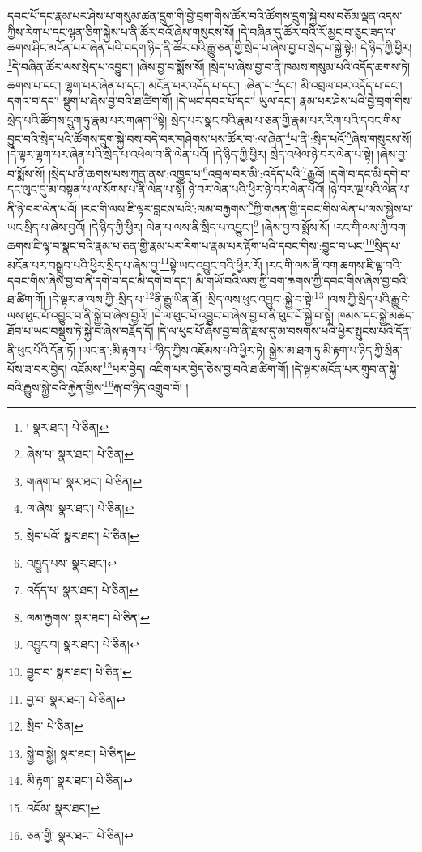 དབང་པོ་དང་རྣམ་པར་ཤེས་པ་གསུམ་ཚན་དྲུག་གི་བྱེ་བྲག་གིས་ཚོར་བའི་ཚོགས་དྲུག་སྐྱེ་བས་བཅོམ་ལྡན་འདས་ཀྱིས་རེག་པ་དང་ལྷན་ཅིག་སྐྱེས་པ་ནི་ཚོར་བའོ་ཞེས་གསུངས་སོ། །དེ་བཞིན་དུ་ཚོར་བའི་རོ་མྱང་བ་ཅུང་ཟད་ལ་ཆགས་ཤིང་མངོན་པར་ཞེན་པའི་བདག་ཉིད་ནི་ཚོར་བའི་རྒྱུ་ཅན་གྱི་སྲེད་པ་ཞེས་བྱ་བ་སྲེད་པ་སྐྱེ་སྟེ:། དེ་ཉིད་ཀྱི་ཕྱིར། \footnote{།    སྣར་ཐང་།  པེ་ཅིན། }དེ་བཞིན་ཚོར་ལས་སྲེད་པ་འབྱུང་། །ཞེས་བྱ་བ་སྨོས་སོ། །སྲེད་པ་ཞེས་བྱ་བ་ནི་ཁམས་གསུམ་པའི་འདོད་ཆགས་ཏེ། ཆགས་པ་དང་། ལྷག་པར་ཞེན་པ་དང་། མངོན་པར་འདོད་པ་དང་། :ཞེན་པ་\footnote{ཞེས་པ་  སྣར་ཐང་།  པེ་ཅིན། }དང་། མི་འབྲལ་བར་འདོད་པ་དང་། དགའ་བ་དང་། སྡུག་པ་ཞེས་བྱ་བའི་ཐ་ཚིག་གོ། །དེ་ཡང་དབང་པོ་དང་། ཡུལ་དང་། རྣམ་པར་ཤེས་པའི་བྱེ་བྲག་གིས་སྲེད་པའི་ཚོགས་དྲུག་ཏུ་རྣམ་པར་གཞག་\footnote{གཞག་པ་  སྣར་ཐང་།  པེ་ཅིན། }སྟེ། སྲེད་པར་སྣང་བའི་རྣམ་པ་ཅན་གྱི་རྣམ་པར་རིག་པའི་དབང་གིས་བྱུང་བའི་སྲེད་པའི་ཚོགས་དྲུག་སྐྱེ་བས་བདེ་བར་གཤེགས་པས་ཚོར་བ་:ལ་ཞེན་\footnote{ལ་ཞེས་  སྣར་ཐང་།  པེ་ཅིན། }པ་ནི་:སྲིད་པའོ་\footnote{སྲེད་པའོ་  སྣར་ཐང་།  པེ་ཅིན། }ཞེས་གསུངས་སོ། །དེ་ལྟར་ལྷག་པར་ཞེན་པའི་སྲེད་པ་འཕེལ་བ་ནི་ལེན་པའོ། །དེ་ཉིད་ཀྱི་ཕྱིར། སྲེད་འཕེལ་ཉེ་བར་ལེན་པ་སྟེ། །ཞེས་བྱ་བ་སྨོས་སོ། །སྲེད་པ་ནི་ཆགས་པས་ཀུན་ནས་:འཁྱུད་པ་\footnote{འཁྱུད་པས་  སྣར་ཐང་། }འབྲལ་བར་མི་:འདོད་པའི་\footnote{འདོད་པ་  སྣར་ཐང་།  པེ་ཅིན། }རྒྱུའོ། །དགེ་བ་དང་མི་དགེ་བ་དང་ལུང་དུ་མ་བསྟན་པ་ལ་སོགས་པ་ནི་ལེན་པ་སྟེ། ཉེ་བར་ལེན་པའི་ཕྱིར་ཉེ་བར་ལེན་པའོ། །ཉེ་བར་ལྔ་པའི་ལེན་པ་ནི་ཉེ་བར་ལེན་པའོ། །རང་གི་ལས་ཇི་ལྟར་བླངས་པའི་:ལམ་བརྒྱགས་\footnote{ལམ་རྒྱགས་  སྣར་ཐང་།  པེ་ཅིན། }ཀྱི་གཞན་གྱི་དབང་གིས་ལེན་པ་ལས་སྐྱེས་པ་ཡང་སྲིད་པ་ཞེས་བྱའོ། །དེ་ཉིད་ཀྱི་ཕྱིར། ལེན་པ་ལས་ནི་སྲིད་པ་འབྱུང་།\footnote{འབྱུང་བ།  སྣར་ཐང་།  པེ་ཅིན། } །ཞེས་བྱ་བ་སྨོས་སོ། །རང་གི་ལས་ཀྱི་བག་ཆགས་ཇི་ལྟ་བ་སྣང་བའི་རྣམ་པ་ཅན་གྱི་རྣམ་པར་རིག་པ་རྣམ་པར་རྟོག་པའི་དབང་གིས་:བྱུང་བ་ཡང་\footnote{བྱུང་བ་  སྣར་ཐང་།  པེ་ཅིན། }སྲིད་པ་མངོན་པར་བསྒྲུབ་པའི་ཕྱིར་སྲིད་པ་ཞེས་བྱ་\footnote{བྱ་བ་  སྣར་ཐང་།  པེ་ཅིན། }སྟེ་ཡང་འབྱུང་བའི་ཕྱིར་རོ། །རང་གི་ལས་ནི་བག་ཆགས་ཇི་ལྟ་བའི་དབང་གིས་ཞེས་བྱ་བ་ནི་དགེ་བ་དང་མི་དགེ་བ་དང་། མི་གཡོ་བའི་ལས་ཀྱི་བག་ཆགས་ཀྱི་དབང་གིས་ཞེས་བྱ་བའི་ཐ་ཚིག་གོ། །དེ་ལྟར་ན་ལས་ཀྱི་:སྲིད་པ་\footnote{སྲིད་  པེ་ཅིན། }ནི་རྒྱུ་ཡིན་ནོ། །སྲིད་ལས་ཕུང་འབྱུང་:སྐྱེ་བ་སྟེ།\footnote{སྐྱེ་བ་སྐྱེ།  སྣར་ཐང་།  པེ་ཅིན། } །ལས་ཀྱི་སྲིད་པའི་རྒྱུ་དེ་ལས་ཕུང་པོ་འབྱུང་བ་ནི་སྐྱེ་བ་ཞེས་བྱའོ། །དེ་ལ་ཕུང་པོ་འབྱུང་བ་ཞེས་བྱ་བ་ནི་ཕུང་པོ་སྐྱེ་བ་སྟེ། ཁམས་དང་སྐྱེ་མཆེད་ཐོབ་པ་ཡང་བསྡུས་ཏེ་སྐྱེ་བ་ཞེས་བརྗོད་དོ། །དེ་ལ་ཕུང་པོ་ཞེས་བྱ་བ་ནི་རྫས་དུ་མ་བསགས་པའི་ཕྱིར་སྤུངས་པའི་དོན་ནི་ཕུང་པོའི་དོན་ཏོ། །ཡང་ན་:མི་རྟག་པ་\footnote{མི་རྟག་  སྣར་ཐང་།  པེ་ཅིན། }ཉིད་ཀྱིས་འཇོམས་པའི་ཕྱིར་ཏེ། སྐྱེས་མ་ཐག་ཏུ་མི་རྟག་པ་ཉིད་ཀྱི་སྲིན་པོས་ཟ་བར་བྱེད། འཇོམས་\footnote{འཇོམ་  སྣར་ཐང་། }པར་བྱེད། འཇིག་པར་བྱེད་ཅེས་བྱ་བའི་ཐ་ཚིག་གོ། །དེ་ལྟར་མངོན་པར་གྲུབ་ན་སྐྱེ་བའི་རྒྱུས་སྐྱེ་བའི་རྐྱེན་གྱིས་\footnote{ཅན་གྱི་  སྣར་ཐང་།  པེ་ཅིན། }རྒ་བ་ཉིད་འགྲུབ་བོ། །
